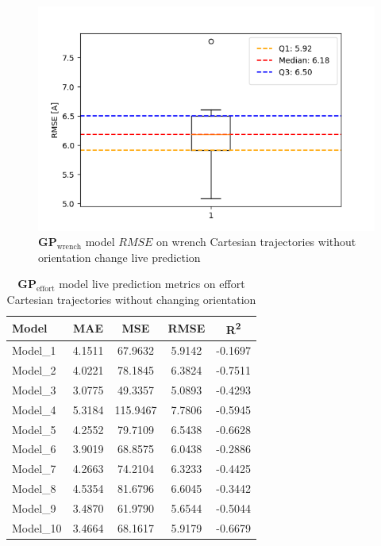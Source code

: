     \begin{figure}[H]
    \centering
    \includegraphics[width=1\columnwidth]{Images/05_results/wrench_boxplot_live_non_OC_RMSE.png}
    \caption[\(\boldsymbol{GP}_{\text{wrench}}\) model \(RMSE\) on wrench Cartesian trajectories without orientation change live prediction]{\(\boldsymbol{GP}_{\text{wrench}}\) model \(RMSE\) on wrench Cartesian trajectories without orientation change live prediction}
    \label{fig:wrench_no_oc_RMSE_live}
    \end{figure}

    
    \begin{table}[H]
    \centering
    \begin{tabular}{lcccc}
    \toprule
    \textbf{Model} & \textbf{MAE} & \textbf{MSE} & \textbf{RMSE} & \textbf{R\textsuperscript{2}} \\
    \midrule
    Model\_1 & 4.1511 & 67.9632 & 5.9142 & -0.1697 \\
    Model\_2 & 4.0221 & 78.1845 & 6.3824 & -0.7511 \\
    Model\_3 & 3.0775 & 49.3357 & 5.0893 & -0.4293 \\
    Model\_4 & 5.3184 & 115.9467 & 7.7806 & -0.5945 \\
    Model\_5 & 4.2552 & 79.7109 & 6.5438 & -0.6628 \\
    Model\_6 & 3.9019 & 68.8575 & 6.0438 & -0.2886 \\
    Model\_7 & 4.2663 & 74.2104 & 6.3233 & -0.4425 \\
    Model\_8 & 4.5354 & 81.6796 & 6.6045 & -0.3442 \\
    Model\_9 & 3.4870 & 61.9790 & 5.6544 & -0.5044 \\
    Model\_10 & 3.4664 & 68.1617 & 5.9179 & -0.6679 \\
    \bottomrule
    \end{tabular}
    \caption{\(\boldsymbol{GP}_{\text{effort}}\) model live prediction metrics on effort Cartesian trajectories without changing orientation}
    \end{table}

